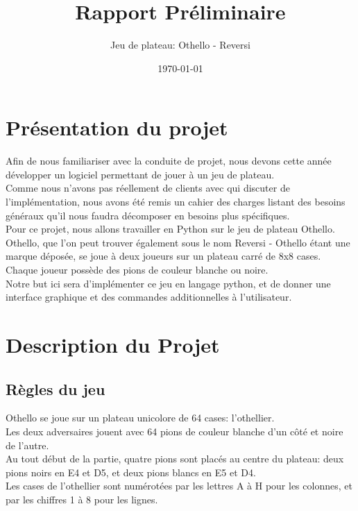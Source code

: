 \documentclass[a4paper,12pt]{article}
\title{\textbf{Rapport Préliminaire}}
\author{Jeu de plateau: Othello - Reversi}
\date{\today}
\begin{document}
\maketitle

\tableofcontents
\newpage

\section{Présentation du projet}

Afin de nous familiariser avec la conduite de projet, nous devons cette année
développer un logiciel permettant de jouer à un jeu de plateau.\\ Comme nous
n'avons pas réellement de clients avec qui discuter de l'implémentation, nous
avons été remis un cahier des charges listant des besoins généraux qu'il nous
faudra décomposer en besoins plus spécifiques.\\

Pour ce projet, nous allons travailler en Python sur le jeu de plateau
Othello.\\ Othello, que l'on peut trouver également sous le nom Reversi -
Othello étant une marque déposée, se joue à deux joueurs sur un plateau carré
de 8x8 cases.\\ Chaque joueur possède des pions de couleur blanche ou noire.\\
Notre but ici sera d'implémenter ce jeu en langage python, et de donner une
interface graphique et des commandes additionnelles à l'utilisateur.\\

\section{Description du Projet}
\subsection{Règles du jeu}

Othello se joue sur un plateau unicolore de 64 cases: l'othellier.\\ Les deux
adversaires jouent avec 64 pions de couleur blanche d'un côté et noire de
l'autre.\\ Au tout début de la partie, quatre pions sont placés au centre du
plateau: deux pions noirs en E4 et D5, et deux pions blancs en E5 et D4.\\ Les
cases de l'othellier sont numérotées par les lettres A à H pour les colonnes,
et par les chiffres 1 à 8 pour les lignes.\\
\end{document}
